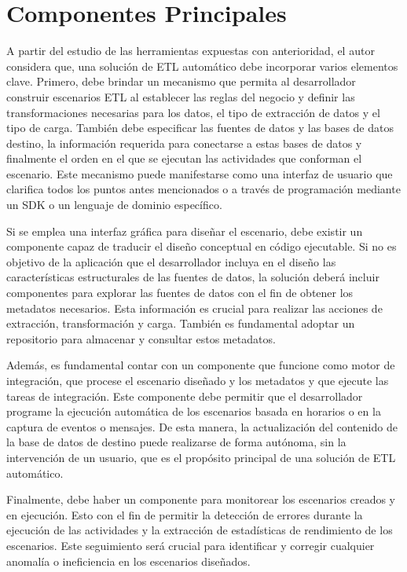 \section{Componentes Principales} \label{section:PrincipalComp}

A partir del estudio de las herramientas expuestas con anterioridad, el autor considera que, 
una solución de ETL automático debe incorporar varios elementos clave. Primero, debe brindar 
un mecanismo que permita al desarrollador construir escenarios ETL al establecer las reglas del negocio y definir las 
transformaciones necesarias para los datos, el tipo de extracción de datos y el tipo de carga. 
También debe especificar las fuentes de datos y las bases de datos destino, 
la información requerida para conectarse a estas bases de datos y finalmente el orden en el que se ejecutan las actividades 
que conforman el escenario. Este mecanismo puede manifestarse como una interfaz de usuario que clarifica todos los puntos 
antes mencionados o a través de programación mediante un SDK o un lenguaje de dominio específico.

Si se emplea una interfaz gráfica para diseñar el escenario, debe existir un componente capaz de traducir el diseño 
conceptual en código ejecutable. Si no es objetivo de la aplicación que el desarrollador incluya en el diseño las características 
estructurales de las fuentes de datos, la solución deberá incluir componentes para explorar 
las fuentes de datos con el fin de obtener los metadatos necesarios. Esta información es crucial para realizar las acciones 
de extracción, transformación y carga. También es fundamental adoptar un repositorio para almacenar y consultar estos 
metadatos.

Además, es fundamental contar con un componente que funcione como motor de integración, que procese el escenario diseñado y 
los metadatos y que ejecute las tareas de integración. Este componente debe permitir que el desarrollador programe la ejecución 
automática de los escenarios basada en horarios o en la captura de eventos o mensajes. De esta manera, la actualización 
del contenido de la base de datos de destino puede realizarse de forma autónoma, sin la intervención de un usuario, que es 
el propósito principal de una solución de ETL automático.

Finalmente, debe haber un componente para monitorear los escenarios creados y en ejecución. Esto con el fin de permitir 
la detección de errores durante la ejecución de las actividades y la extracción de estadísticas de rendimiento de los 
escenarios. Este seguimiento será crucial para identificar y corregir cualquier anomalía o ineficiencia en los escenarios 
diseñados.  

 